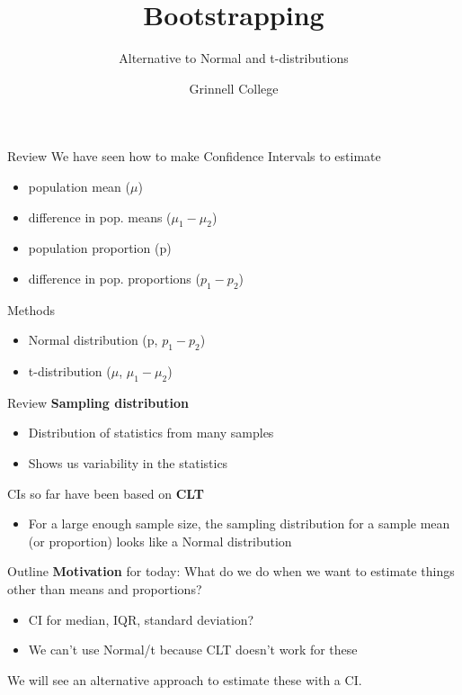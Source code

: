\documentclass{beamer}
\title[Introduction to Statistics]{Bootstrapping}
\subtitle{Alternative to Normal and t-distributions}
\author{Grinnell College}
\date{}
\begin{document}
\begin{frame}
  \titlepage
\end{frame}

\begin{frame}{Review}
We have seen how to make Confidence Intervals to estimate
\begin{itemize}
    \item population mean ($\mu$)
    \item difference in pop. means ($\mu_1 - \mu_2$)
    \item population proportion (p)
    \item difference in pop. proportions ($p_1 - p_2$)
\end{itemize} \vspace{6mm}

Methods
\begin{itemize}
    \item Normal distribution (p, $p_1 - p_2$)
    \item t-distribution ($\mu$, $\mu_1 - \mu_2$)
\end{itemize}
\end{frame}

\begin{frame}{Review}
\textbf{Sampling distribution}
\begin{itemize}
    \item Distribution of statistics from many samples
    \item Shows us variability in the statistics
\end{itemize} \vspace{6mm}

CIs so far have been based on \textbf{CLT}
\begin{itemize}
    \item For a large enough sample size, the sampling distribution for a sample mean (or proportion) looks like a Normal distribution
\end{itemize}
\end{frame}

\begin{frame}{Outline}
\textbf{Motivation} for today: What do we do when we want to estimate things other than means and proportions?
\begin{itemize}
    \item CI for median, IQR, standard deviation?
    \item We can't use Normal/t because CLT doesn't work for these
\end{itemize} \vspace{12mm}

We will see an alternative approach to estimate these with a CI.
\end{frame}
\end{document}
